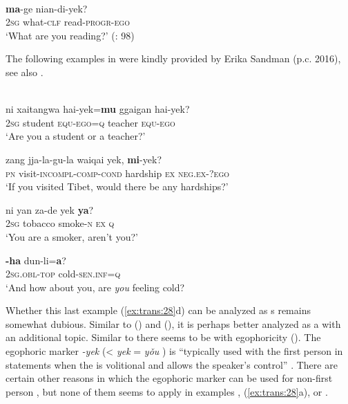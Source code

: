 \ea%
    \label{ex:trans:27}
    \\
     \textbf{{ma}}-ge nian-di-yek?\\
    2\textsc{sg}  what-\textsc{clf}  read-\textsc{progr}-\textsc{ego}\\
    \glt ‘What are you reading?’ (\citealt{Janhunen2008}: 98)
    \z

The following examples in  were kindly provided by Erika Sandman (p.c. 2016), see also \cite[287–297]{Sandman2016}.

\ea%
    \label{ex:trans:28}
    \\
    \ea
    \gll ni  xaitangwa  hai-yek=\textbf{{mu}} ggaigan  hai-yek?\\
    2\textsc{sg}  student    \textsc{equ}-\textsc{ego}=\textsc{q}    teacher    \textsc{equ}-\textsc{ego}\\
    \glt ‘Are you a student or a teacher?’
    
    \ex
    \gll zang  jja-la-gu-la {waiqai} {yek,} \textbf{{mi}}{-yek}?\\
    \textsc{pn}  visit-\textsc{incompl}-\textsc{comp}-\textsc{cond}  hardship  \textsc{ex}  \textsc{neg.ex}-?\textsc{ego}\\
    \glt ‘If you visited Tibet, would there be any hardships?’
    
    \ex
    \gll ni  yan {za-de} {yek} \textbf{{ya}}?\\
    \textsc{2sg} tobacco  smoke-\textsc{n} \textsc{ex  q}\\
    \glt ‘You are a smoker, aren’t you?’
    
    \ex
    \textbf{{-ha}} {dun-li=}\textbf{{a}}?\\
    2\textsc{sg.}\textsc{obl}-\textsc{top}  cold-\textsc{sen.}\textsc{inf}=\textsc{q}\\
    \glt ‘And how about you, are \textit{you} feeling cold?\z\z

Whether this last example (\ref{ex:trans:28}d) can be analyzed as s remains somewhat dubious. Similar to  () and  (), it is perhaps better analyzed as a  with an additional topic. Similar to  there seems to be  with egophoricity (). The egophoric marker \textit{-yek} (< \textit{yek} =  \textit{yǒu} ) is “typically used with the first person in statements when the  is volitional and allows the speaker’s control” \citep[209]{Sandman2016}. There are certain other reasons in which the egophoric marker can be used for non-first person \citep[222]{Sandman2016}, but none of them seems to apply in examples , (\ref{ex:trans:28}a), or .

